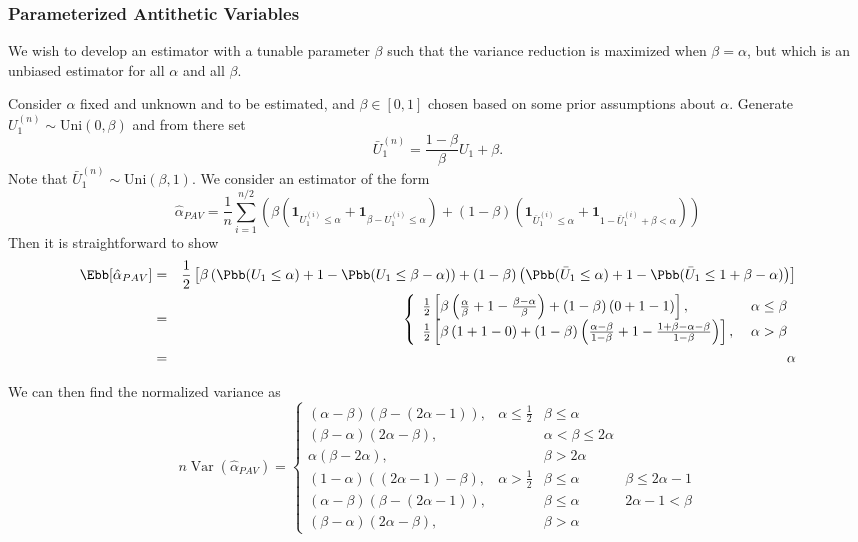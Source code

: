 \documentclass[10pt]{article}
\DeclareMathOperator{\var}{Var}
\begin{document}
\subsubsection{Parameterized Antithetic Variables}
We wish to develop an estimator with a tunable parameter $\beta$ such that the variance reduction is maximized when $\beta=\alpha$, but which is an unbiased estimator for all $\alpha$ and all $\beta$.

Consider $\alpha$ fixed and unknown and to be estimated, and $\beta \in [0,1]$ chosen based on some prior assumptions about $\alpha$. Generate $U_{1}^{(n)} \sim \mathrm{Uni}(0,\beta)$ and from there set
\begin{equation}
\bar{U}_{1}^{(n)} = \frac{1-\beta}{\beta} U_1 + \beta.
\end{equation}
Note that $\bar{U}_{1}^{(n)} \sim \mathrm{Uni}(\beta,1)$. We consider an estimator of the form
\begin{equation}
\hat{\alpha}_{PAV} = \frac{1}{n} \sum_{i=1}^{n/2} \left( \beta \left( \mathbf{1}_{U_{1}^{(i)} \leq \alpha} + \mathbf{1}_{\beta-U_{1}^{(i)} \leq \alpha} \right) + (1-\beta) \left( \mathbf{1}_{\bar{U}_{1}^{(i)} \leq \alpha} + \mathbf{1}_{1-\bar{U}_{1}^{(i)} + \beta < \alpha} \right) \right)
\end{equation}
Then it is straightforward to show
\begin{eqnarray}
\Ebb[\hat{\alpha}_{PAV}] &=& \frac{1}{2} \left[ \beta \left( \Pbb(U_1 \leq \alpha) + 1 - \Pbb(U_1 \leq \beta - \alpha) \right) + (1-\beta) \left( \Pbb(\bar{U}_1 \leq \alpha) + 1 - \Pbb( \bar{U}_1 \leq 1+ \beta - \alpha) \right) \right] \nonumber \\
&=& \left\{ \begin{array}{ll}
\frac{1}{2} \left[ \beta \left( \frac{\alpha}{\beta} + 1 - \frac{\beta-\alpha}{\beta} \right) + (1-\beta) \left(0 + 1 - 1 \right) \right] , \; & \alpha \leq \beta \\
\frac{1}{2} \left[ \beta \left(1 + 1 - 0 \right) + (1-\beta) \left( \frac{\alpha-\beta}{1-\beta} + 1 - \frac{1+\beta-\alpha-\beta}{1-\beta} \right) \right], \; & \alpha > \beta 
\end{array} \right. \nonumber \\
&=& \alpha
\end{eqnarray}

We can then find the normalized variance as
\begin{equation}n\var(\hat{\alpha}_{PAV}) = \left\{
\begin{array}{llll}
(\alpha-\beta)(\beta-(2\alpha-1)), & \alpha \leq \frac{1}{2} & \beta \leq \alpha & \\
(\beta-\alpha)(2\alpha-\beta), & & \alpha < \beta \leq 2 \alpha &  \\
\alpha(\beta-2\alpha), & & \beta > 2 \alpha & \\
(1-\alpha)((2\alpha-1)-\beta), & \alpha > \frac{1}{2} & \beta \leq \alpha & \beta \leq 2 \alpha - 1 \\
(\alpha-\beta)(\beta - (2\alpha-1)), & & \beta \leq \alpha & 2 \alpha - 1 < \beta \\
(\beta-\alpha)(2\alpha-\beta), & & \beta > \alpha 
\end{array}\right.
\end{equation}
\end{document}

